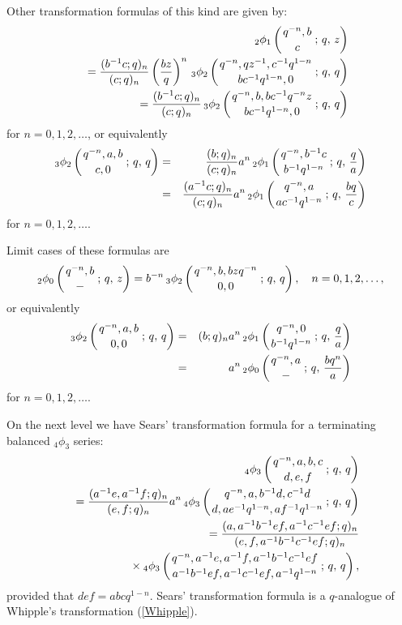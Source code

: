 \documentclass[envcountchap,graybox]{svmono}
\newcommand{\qhyp}[5]{\mbox{}_{#1}{\phi}_{#2}
\left(\genfrac{}{}{0pt}{}{#3}{#4}\,;\,q,\,#5\right)}
\newcommand{\mathindent}{\hspace{7.5mm}}
\begin{document}
Other transformation formulas of this kind are given by:
\begin{eqnarray}
\label{Jackson3}
& &\qhyp{2}{1}{q^{-n},b}{c}{z}\nonumber\\
& &{}=\frac{(b^{-1}c;q)_n}{(c;q)_n}\left(\frac{bz}{q}\right)^n\,
\qhyp{3}{2}{q^{-n},qz^{-1},c^{-1}q^{1-n}}{bc^{-1}q^{1-n},0}{q}\\
& &{}=\frac{(b^{-1}c;q)_n}{(c;q)_n}\,\qhyp{3}{2}{q^{-n},b,bc^{-1}q^{-n}z}
{bc^{-1}q^{1-n},0}{q}\label{Jackson4}
\end{eqnarray}
for $n=0,1,2,\ldots$, or equivalently
\begin{eqnarray}
\label{Jackson5}
\qhyp{3}{2}{q^{-n},a,b}{c,0}{q}&=&
\frac{(b;q)_n}{(c;q)_n}a^n\,\qhyp{2}{1}{q^{-n},b^{-1}c}{b^{-1}q^{1-n}}{\frac{q}{a}}\\
&=&\frac{(a^{-1}c;q)_n}{(c;q)_n}a^n\,\qhyp{2}{1}{q^{-n},a}{ac^{-1}q^{1-n}}{\frac{bq}{c}}\label{Jackson6}
\end{eqnarray}
for $n=0,1,2,\ldots$.

Limit cases of these formulas are
\begin{equation}
\label{Jacksonlimit1}
\qhyp{2}{0}{q^{-n},b}{-}{z}=b^{-n}\,
\qhyp{3}{2}{q^{-n},b,bzq^{-n}}{0,0}{q},\quad n=0,1,2,\ldots,
\end{equation}
or equivalently
\begin{eqnarray}
\label{Jacksonlimit2}
\qhyp{3}{2}{q^{-n},a,b}{0,0}{q}&=&(b;q)_na^n\,
\qhyp{2}{1}{q^{-n},0}{b^{-1}q^{1-n}}{\frac{q}{a}}\\
&=&a^n\,\qhyp{2}{0}{q^{-n},a}{-}{\frac{bq^n}{a}}\label{Jacksonlimit3}
\end{eqnarray}
for $n=0,1,2,\ldots$.

On the next level we have Sears' transformation formula for a terminating
balanced ${}_4\phi_3$ series:
\begin{eqnarray}
\label{Sears1}\index{Sears' transformation formula}\index{Transformation formula!Sears}
& &\qhyp{4}{3}{q^{-n},a,b,c}{d,e,f}{q}\nonumber\\
& &{}=\frac{(a^{-1}e,a^{-1}f;q)_n}{(e,f;q)_n}a^n\,\qhyp{4}{3}{q^{-n},a,b^{-1}d,c^{-1}d}
{d,ae^{-1}q^{1-n},af^{-1}q^{1-n}}{q}\\
& &{}=\frac{(a,a^{-1}b^{-1}ef,a^{-1}c^{-1}ef;q)_n}{(e,f,a^{-1}b^{-1}c^{-1}ef;q)_n}\nonumber\\
& &{}\mathindent\times\qhyp{4}{3}{q^{-n},a^{-1}e,a^{-1}f,a^{-1}b^{-1}c^{-1}ef}
{a^{-1}b^{-1}ef,a^{-1}c^{-1}ef,a^{-1}q^{1-n}}{q},\label{Sears2}
\end{eqnarray}
provided that $def=abcq^{1-n}$.
Sears' transformation formula is a $q$-analogue of Whipple's transformation (\ref{Whipple}).
\end{document}
